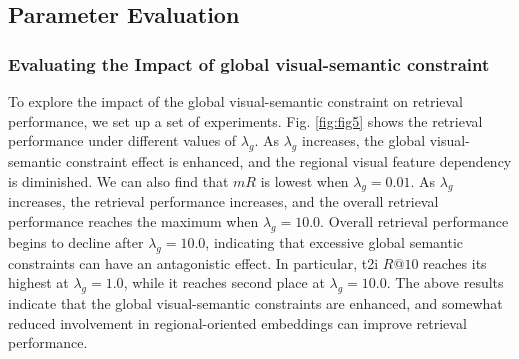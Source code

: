 \documentclass[journal]{IEEEtran}
\begin{document}
\begin{table}[t]
\renewcommand\arraystretch{1.5}
\caption{Comparison experiments of different DTGA input combinations on RSITMD test set.}
\label{tab:table2}
\end{table}
\subsection{Parameter Evaluation}
\subsubsection{Evaluating the Impact of global visual-semantic constraint}
To explore the impact of the global visual-semantic constraint on retrieval performance, we set up a set of experiments. Fig. \ref{fig:fig5} shows the retrieval performance under different values of $\lambda_g$. As $\lambda_g$ increases, the global visual-semantic constraint effect is enhanced, and the regional visual feature dependency is diminished. We can also find that $mR$ is lowest when $\lambda_g=0.01$. As $\lambda_g$ increases, the retrieval performance increases, and the overall retrieval performance reaches the maximum when $\lambda_g=10.0$. Overall retrieval performance begins to decline after $\lambda_g=10.0$, indicating that excessive global semantic constraints can have an antagonistic effect. In particular, t2i $R@10$ reaches its highest at $\lambda_g=1.0$, while it reaches second place at $\lambda_g=10.0$. The above results indicate that the global visual-semantic constraints are enhanced, and somewhat reduced involvement in regional-oriented embeddings can improve retrieval performance.
\end{document}
